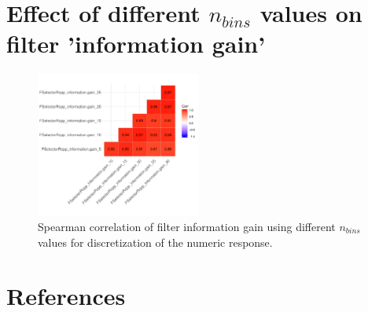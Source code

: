 \documentclass[letterpaper, peerreview]{IEEEtran}
\begin{document}
\section{Effect of different \texorpdfstring{\(n_{bins}\)}{nbins} values on filter 'information gain'}

\begin{figure} [ht]
	\begin{center}
		\includegraphics[width=0.48\textwidth] {correlation-nbins-1.pdf}
		\caption{Spearman correlation of filter information gain using different \texttt{\(n_{bins}\)} values for discretization of the numeric response.}\label{fig:correlation-nbins}
	\end{center}
\end{figure}

\pagebreak




\section*{References}
\end{document}
